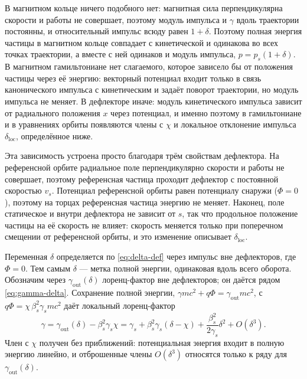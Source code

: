 В магнитном кольце ничего подобного нет: магнитная сила перпендикулярна скорости и работы не совершает, поэтому модуль импульса и $\gamma$ вдоль траектории постоянны, и относительный импульс всюду равен $1+\delta$. Поэтому полная энергия частицы в магнитном кольце совпадает с кинетической и одинакова во всех точках траектории, а вместе с ней одинаков и модуль импульса, $p=p_s(1+\delta)$. В магнитном гамильтониане нет слагаемого, которое зависело бы от положения частицы через её энергию: векторный потенциал входит только в связь канонического импульса с кинетическим и задаёт поворот траектории, но модуль импульса не меняет. В дефлекторе иначе: модуль кинетического импульса зависит от радиального положения $x$ через потенциал, и именно поэтому в гамильтониане и в уравнениях орбиты появляются члены с $\chi$ и локальное отклонение импульса $\delta_{\mathrm{loc}}$, определённое ниже.

Эта зависимость устроена просто благодаря трём свойствам дефлектора. На референсной орбите радиальное поле перпендикулярно скорости и работы не совершает, поэтому референсная частица проходит дефлектор с постоянной скоростью $v_s$. Потенциал референсной орбиты равен потенциалу снаружи ($\Phi=0$), поэтому на торцах референсная частица энергию не меняет. Наконец, поле статическое и внутри дефлектора не зависит от $s$, так что продольное положение частицы на её скорость не влияет: скорость меняется только при поперечном смещении от референсной орбиты, и это изменение описывает $\delta_{\mathrm{loc}}$.

Переменная $\delta$ определяется по \eqref{eq:delta-def} через импульс вне дефлекторов, где $\Phi=0$. Тем самым $\delta$ --- метка полной энергии, одинаковая вдоль всего оборота. Обозначим через $\gamma_{\mathrm{out}}(\delta)$ лоренц-фактор вне дефлекторов; он даётся рядом \eqref{eq:gamma-delta}. Сохранение полной энергии, $\gamma mc^2+q\Phi=\gamma_{\mathrm{out}}mc^2$, с $q\Phi=\chi\,\beta_s^2\gamma_s mc^2$ даёт локальный лоренц-фактор
\begin{equation}
\label{eq:gamma-loc}
\gamma=\gamma_{\mathrm{out}}(\delta)-\beta_s^2\gamma_s\chi
=\gamma_s+\beta_s^2\gamma_s(\delta-\chi)
+\frac{\beta_s^2}{2\gamma_s}\delta^2
+O(\delta^3).
\end{equation}
Член с $\chi$ получен без приближений: потенциальная энергия входит в полную энергию линейно, и отброшенные члены $O(\delta^3)$ относятся только к ряду для $\gamma_{\mathrm{out}}(\delta)$.

